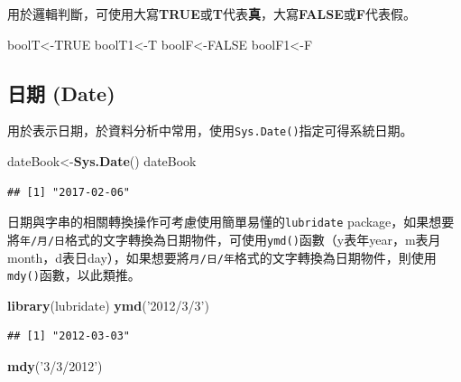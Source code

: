 \documentclass[]{book}
\newenvironment{Shaded}{\begin{snugshade}}{\end{snugshade}}
\newcommand{\KeywordTok}[1]{\textcolor[rgb]{0.13,0.29,0.53}{\textbf{{#1}}}}
\newcommand{\StringTok}[1]{\textcolor[rgb]{0.31,0.60,0.02}{{#1}}}
\newcommand{\OtherTok}[1]{\textcolor[rgb]{0.56,0.35,0.01}{{#1}}}
\newcommand{\NormalTok}[1]{{#1}}
\theoremstyle{definition}
\theoremstyle{definition}
\theoremstyle{remark}
\begin{document}
用於邏輯判斷，可使用大寫\textbf{TRUE}或\textbf{T}代表\textbf{真}，大寫\textbf{FALSE}或\textbf{F}代表假。

\begin{Shaded}
\begin{Highlighting}[]
\NormalTok{boolT<-}\OtherTok{TRUE}
\NormalTok{boolT1<-T}
\NormalTok{boolF<-}\OtherTok{FALSE}
\NormalTok{boolF1<-F}
\end{Highlighting}
\end{Shaded}

\subsection{日期 (Date)}\label{-date}

用於表示日期，於資料分析中常用，使用\texttt{Sys.Date()}指定可得系統日期。

\begin{Shaded}
\begin{Highlighting}[]
\NormalTok{dateBook<-}\KeywordTok{Sys.Date}\NormalTok{()}
\NormalTok{dateBook}
\end{Highlighting}
\end{Shaded}

\begin{verbatim}
## [1] "2017-02-06"
\end{verbatim}

日期與字串的相關轉換操作可考慮使用簡單易懂的\texttt{lubridate}\citep{R-lubridate}
package，如果想要將\texttt{年/月/日}格式的文字轉換為日期物件，可使用\texttt{ymd()}函數（y表年year，m表月month，d表日day），如果想要將\texttt{月/日/年}格式的文字轉換為日期物件，則使用\texttt{mdy()}函數，以此類推。

\begin{Shaded}
\begin{Highlighting}[]
\KeywordTok{library}\NormalTok{(lubridate)}
\KeywordTok{ymd}\NormalTok{(}\StringTok{'2012/3/3'}\NormalTok{)}
\end{Highlighting}
\end{Shaded}

\begin{verbatim}
## [1] "2012-03-03"
\end{verbatim}

\begin{Shaded}
\begin{Highlighting}[]
\KeywordTok{mdy}\NormalTok{(}\StringTok{'3/3/2012'}\NormalTok{)}
\end{Highlighting}
\end{Shaded}
\end{document}
